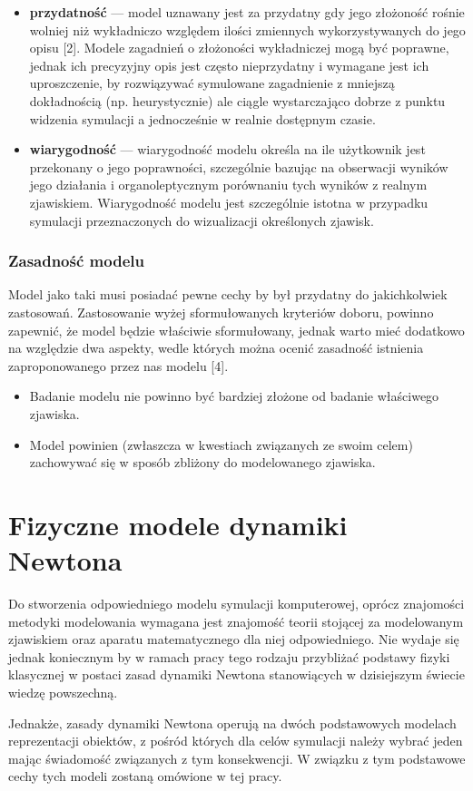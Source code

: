 {\begin{itemize}
{\begin{center}
\textit{Poprawność modelu względem modelowanego zjawiska [2].}
\end{center}
}
\item \textbf{przydatność} --- model uznawany jest za przydatny gdy jego złożoność rośnie wolniej niż wykładniczo względem ilości zmiennych wykorzystywanych do jego opisu [2]. Modele zagadnień o złożoności wykładniczej mogą być poprawne, jednak ich precyzyjny opis jest często nieprzydatny i wymagane jest ich uproszczenie, by rozwiązywać symulowane zagadnienie z mniejszą dokładnością (np. heurystycznie) ale ciągle wystarczająco dobrze z punktu widzenia symulacji a jednocześnie w realnie dostępnym czasie.
\item \textbf{wiarygodność} --- wiarygodność modelu określa na ile użytkownik jest przekonany o jego poprawności, szczególnie bazując na obserwacji wyników jego działania i organoleptycznym porównaniu tych wyników z realnym zjawiskiem. Wiarygodność modelu jest szczególnie istotna w przypadku symulacji przeznaczonych do wizualizacji określonych zjawisk.
\end{itemize}
}

\subsubsection{Zasadność modelu}
\par{
Model jako taki musi posiadać pewne cechy by był przydatny do jakichkolwiek zastosowań. Zastosowanie wyżej sformułowanych kryteriów doboru, powinno zapewnić, że model będzie właściwie sformułowany, jednak warto mieć dodatkowo na względzie dwa aspekty, wedle których można ocenić zasadność istnienia zaproponowanego przez nas modelu [4].
\begin{itemize}
\item Badanie modelu nie powinno być bardziej złożone od badanie właściwego zjawiska.
\item Model powinien (zwłaszcza w kwestiach związanych ze swoim celem) zachowywać się w sposób zbliżony do modelowanego zjawiska.
\end{itemize}
}


\section[Fizyczne modele dynamiki Newtona][Fizyczne modele dynamiki Newtona]{Fizyczne modele dynamiki Newtona}

\par{
Do stworzenia odpowiedniego modelu symulacji komputerowej, oprócz znajomości metodyki modelowania wymagana jest znajomość teorii stojącej za modelowanym zjawiskiem oraz aparatu matematycznego dla niej odpowiedniego. Nie wydaje się jednak koniecznym by w ramach pracy tego rodzaju przybliżać podstawy fizyki klasycznej w postaci zasad dynamiki Newtona stanowiących w dzisiejszym świecie wiedzę powszechną.
}
\par{
Jednakże, zasady dynamiki Newtona operują na dwóch podstawowych modelach reprezentacji obiektów, z pośród których dla celów symulacji należy wybrać jeden mając świadomość związanych z tym konsekwencji. W związku z tym podstawowe cechy tych modeli zostaną omówione w tej pracy.
}

